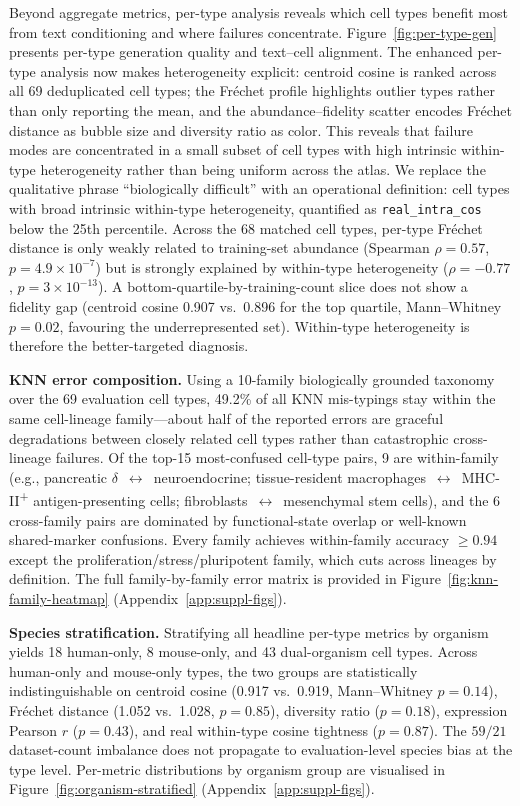 \documentclass[11pt,a4paper]{article}
\begin{document}
Beyond aggregate metrics, per-type analysis reveals which cell types benefit most from text conditioning and where failures concentrate. Figure~\ref{fig:per-type-gen} presents per-type generation quality and text--cell alignment. The enhanced per-type analysis now makes heterogeneity explicit: centroid cosine is ranked across all 69 deduplicated cell types; the Fr\'echet profile highlights outlier types rather than only reporting the mean, and the abundance--fidelity scatter encodes Fr\'echet distance as bubble size and diversity ratio as color. This reveals that failure modes are concentrated in a small subset of cell types with high intrinsic within-type heterogeneity rather than being uniform across the atlas. We replace the qualitative phrase ``biologically difficult'' with an operational definition: cell types with broad intrinsic within-type heterogeneity, quantified as \texttt{real\_intra\_cos} below the 25th percentile. Across the 68 matched cell types, per-type Fr\'echet distance is only weakly related to training-set abundance (Spearman $\rho = 0.57$, $p = 4.9\times10^{-7}$) but is strongly explained by within-type heterogeneity ($\rho = -0.77$, $p = 3\times10^{-13}$). A bottom-quartile-by-training-count slice does not show a fidelity gap (centroid cosine 0.907 vs.\ 0.896 for the top quartile, Mann--Whitney $p = 0.02$, favouring the underrepresented set). Within-type heterogeneity is therefore the better-targeted diagnosis.

\textbf{KNN error composition.} Using a 10-family biologically grounded taxonomy over the 69 evaluation cell types, 49.2\% of all KNN mis-typings stay within the same cell-lineage family---about half of the reported errors are graceful degradations between closely related cell types rather than catastrophic cross-lineage failures. Of the top-15 most-confused cell-type pairs, 9 are within-family (e.g., pancreatic $\delta$~$\leftrightarrow$~neuroendocrine; tissue-resident macrophages~$\leftrightarrow$~MHC-II\textsuperscript{+} antigen-presenting cells; fibroblasts~$\leftrightarrow$~mesenchymal stem cells), and the 6 cross-family pairs are dominated by functional-state overlap or well-known shared-marker confusions. Every family achieves within-family accuracy $\geq 0.94$ except the proliferation/stress/pluripotent family, which cuts across lineages by definition. The full family-by-family error matrix is provided in Figure~\ref{fig:knn-family-heatmap} (Appendix~\ref{app:suppl-figs}).

\textbf{Species stratification.} Stratifying all headline per-type metrics by organism yields 18 human-only, 8 mouse-only, and 43 dual-organism cell types. Across human-only and mouse-only types, the two groups are statistically indistinguishable on centroid cosine (0.917 vs.\ 0.919, Mann--Whitney $p = 0.14$), Fr\'echet distance (1.052 vs.\ 1.028, $p = 0.85$), diversity ratio ($p = 0.18$), expression Pearson $r$ ($p = 0.43$), and real within-type cosine tightness ($p = 0.87$). The $59/21$ dataset-count imbalance does not propagate to evaluation-level species bias at the type level. Per-metric distributions by organism group are visualised in Figure~\ref{fig:organism-stratified} (Appendix~\ref{app:suppl-figs}).
\end{document}
